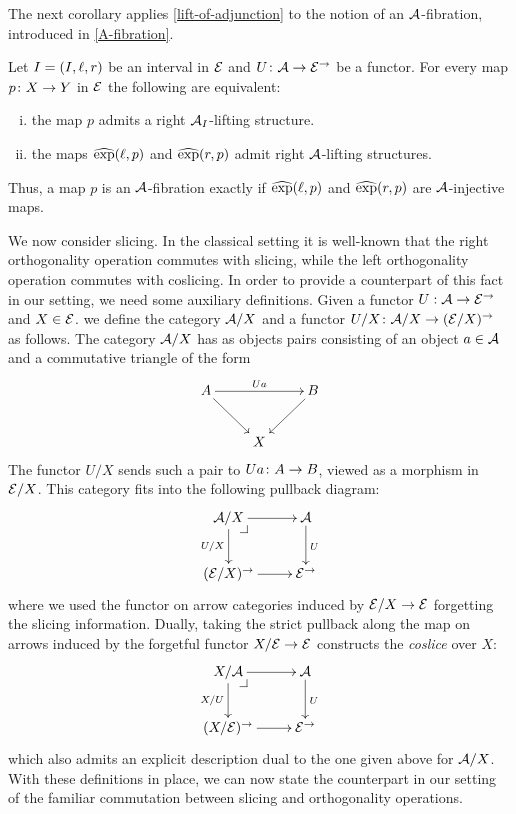 \documentclass[reqno,10pt,a4paper,oneside]{amsart}
\begin{document}
The next corollary applies \cref{lift-of-adjunction} to the notion of an $\cal{A}$-fibration, introduced
in \cref{A-fibration}.


\begin{corollary} Let $\interval = (\interval, \intervall, \intervalr)$ be an interval in $\catE$ and
 $U \co \cal{A} \to \catE^\to$ be a functor. For every map $p \co X \to Y$ in $\cal{E}$ 
 the following are equivalent: 
\begin{enumerate}[(i)]
\item the map $p$ admits a right $\cal{A}_I$-lifting structure. 
\item the maps $\hatexp(\intervall, p)$ and $\hatexp(\intervalr, p)$ admit right $\cal{A}$-lifting structures.
\end{enumerate} 
Thus, a map $p$ is an $\cal{A}$-fibration exactly if $\hatexp(\intervall, p)$ and $\hatexp(\intervalr, p)$ are 
$\cal{A}$-injective maps.
\end{corollary}


\medskip


We now consider slicing. In the classical setting it is well-known that the right orthogonality operation commutes with slicing, while the left orthogonality operation commutes with coslicing.  In order to provide a counterpart of this fact in our setting, we need some auxiliary definitions. Given a functor $U : \cal{A} \to \catE^{\to}$ and $X \in \catE$.  we define the category $\cal{A}/X$
and a functor $U/X \co \cal{A}/X \to (\cal{E}/X)^\to$ as follows. The category $\cal{A}/X$ has as objects pairs consisting of an object $a \in \cal{A}$ and a commutative triangle of the form
\[
\xymatrix{
A \ar[dr] \ar[rr]^{Ua} & & B  \ar[dl] \\
 & X }
 \]
The functor $U/X$ sends such a pair to $Ua \co A \to B$, viewed as a morphism in $\cal{E}/X$. This category fits into the
following pullback diagram:
\[
\xymatrix{
  \cal{A}/X
  \ar[r]
  \ar[d]_{U/X}
  \pullback{dr}
&
  \cal{A}
  \ar[d]^{U}
\\
  (\catE/X)^{\to}
  \ar[r]
&
  \catE^{\to}
}
\]
where we used the functor on arrow categories induced by $\catE/X \to \catE$ forgetting the slicing information.  Dually, taking the strict pullback along the map on arrows induced by the forgetful functor $X/\cal{E} \to \catE$ constructs the \emph{coslice} over $X$:
\[
\xymatrix{
  X/\cal{A}
  \ar[r]
  \ar[d]_{X/U}
  \pullback{dr}
&
  \cal{A}
  \ar[d]^{U}
\\
  (X/\catE)^{\to}
  \ar[r]
&
  \catE^{\to}
}
\]
which also admits an explicit description dual to the one given above for $\cal{A}/X$. With these definitions in place, we can now state the counterpart in our setting of the familiar commutation between slicing and orthogonality operations. 
\end{document}
